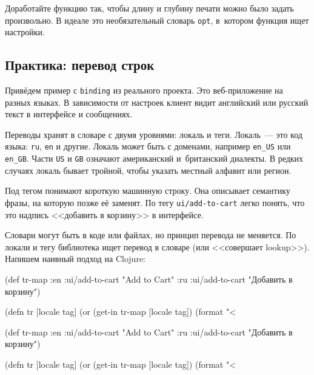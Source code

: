 
Доработайте функцию так, чтобы длину и глубину печати можно было задать
произвольно. В идеале это необязательный словарь \verb|opt|, в~котором функция
ищет настройки.

\subsection{Практика: перевод строк}

\label{translate}

Привёдем пример с \verb|binding| из реального проекта. Это веб-приложение на
разных языках. В зависимости от настроек клиент видит английский или русский
текст в интерфейсе и сообщениях.


Переводы хранят в словаре с двумя уровнями: локаль и теги. Локаль~--- это код
языка: \verb|ru|, \verb|en| и другие. Локаль может быть с доменами, например
\verb|en_US| или \verb|en_GB|. Части \verb|US| и \verb|GB| означают
американский и~британский диалекты. В редких случаях локаль бывает тройной,
чтобы указать местный алфавит или регион.

Под тегом понимают короткую машинную строку. Она описывает семантику фразы, на
которую позже её заменят. По тегу \verb|ui/add-to-cart| легко понять, что это
надпись <<добавить в корзину>> в интерфейсе.

Словари могут быть в коде или файлах, но принцип перевода не меняется. По локали
и тегу библиотека ищет перевод в словаре (или <<совершает lookup>>). Напишем
наивный подход на Clojure:

\ifnarrow

  \begin{clojure}
(def tr-map
  {:en {:ui/add-to-cart "Add to Cart"}
   :ru {:ui/add-to-cart
        "Добавить в корзину"}})

(defn tr [locale tag]
  (or (get-in tr-map [locale tag])
      (format "<%
  \end{clojure}

\else

  \begin{clojure}
(def tr-map
  {:en {:ui/add-to-cart "Add to Cart"}
   :ru {:ui/add-to-cart "Добавить в корзину"}})

(defn tr [locale tag]
  (or (get-in tr-map [locale tag])
      (format "<%
  \end{clojure}

